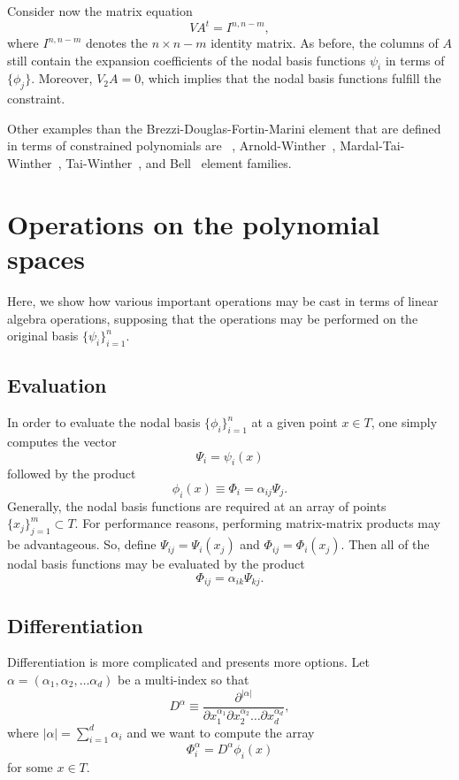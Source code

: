 Consider now the matrix
equation
\begin{equation}
\label{eq:extendedvdmsystem}
V A^t = I^{n,n-m},
\end{equation}
where \( I^{n,n-m} \) denotes the \( n \times n-m \) identity matrix.  
As before, the columns of \( A \) still
contain the expansion coefficients of the nodal basis functions
\( \psi_i \) in terms of \( \{ \phi_j \} \).
Moreover, \( V_2 A = 0 \), which implies that the nodal basis functions
fulfill the constraint. 

Other examples than the Brezzi-Douglas-Fortin-Marini element 
that are defined in terms of constrained polynomials are 
\nedelec~\citep{Nedelec1980}, Arnold-Winther~\citep{ArnoldWinther2002},
Mardal-Tai-Winther~\citep{MardalTaiWinther2002}, 
Tai-Winther~\citep{TaiWinther2006}, and Bell~\citep{Ciarlet2002} element families.


\section{Operations on the polynomial spaces}
Here, we show how various important operations may be cast
in terms of linear algebra operations, supposing that the operations may be performed on
the original basis \( \{ \psi_i \}_{i=1}^{n} \).

\subsection{Evaluation}
In order to evaluate the nodal basis \( \{ \phi_i \}_{i=1}^{n} \)
at a given point \( x \in T \), one simply computes the vector
\begin{equation}
\Psi_i = \psi_i(x)
\end{equation}
followed by the product
\begin{equation}
\phi_i(x) \equiv \Phi_i = \alpha_{ij} \Psi_j.
\end{equation}
Generally, the nodal basis functions are required at an array of
points \( \{ x_j \}_{j=1}^{m} \subset T \).  For performance reasons,
performing matrix-matrix products may be advantageous.  So, define
\( \Psi_{ij} = \Psi_i(x_j) \)  and \( \Phi_{ij} = \Phi_i(x_j) \).
Then all of the nodal basis functions may be evaluated by the
product
\begin{equation}
\Phi_{ij} = \alpha_{ik} \Psi_{kj}.
\end{equation}
\subsection{Differentiation}
Differentiation is more complicated and presents more options.
Let \( \alpha = ( \alpha_1 , \alpha_2 , \dots \alpha_d ) \) be a
multi-index so that
\begin{equation}
D^\alpha \equiv \frac{\partial^{|\alpha|}}{\partial
  x_1^{\alpha_1} \partial x_2^{\alpha_2} \dots \partial x_d^{\alpha_d}},
\end{equation}
where \( |\alpha| = \sum_{i=1}^{d} \alpha_i \) and we want 
to compute the array
\begin{equation}
\Phi^\alpha_i = D^\alpha \phi_i(x)
\end{equation}
for some \( x \in T \).

